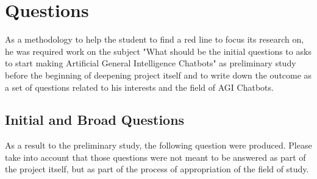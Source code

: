 \chapter{Questions}
\label{chap:questions}

As a methodology to help the student to find a red line to focus its research on, he was required work on the subject "What should be the initial questions to asks to start making Artificial General Intelligence Chatbots" as preliminary study before the beginning of deepening project itself and to write down the outcome as a set of questions related to his interests and the field of AGI Chatbots.

\section{Initial and Broad Questions}
As a result to the preliminary study, the following question were produced. Please take into account that those questions were not meant to be answered as part of the project itself, but as part of the process of appropriation of the field of study.

